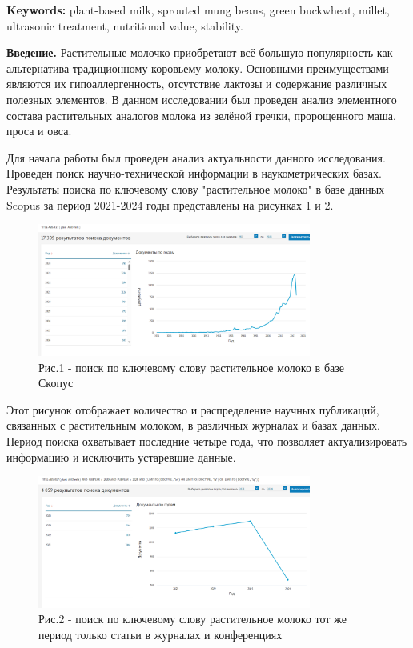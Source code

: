{\bfseries Keywords:} plant-based milk, sprouted mung beans, green
buckwheat, millet, ultrasonic treatment, nutritional value, stability.

\begin{multicols}{2}
{\bfseries Введение.} Растительные молочко приобретают всё большую
популярность как альтернатива традиционному коровьему молоку. Основными
преимуществами являются их гипоаллергенность, отсутствие лактозы и
содержание различных полезных элементов. В данном исследовании был
проведен анализ элементного состава растительных аналогов молока из
зелёной гречки, пророщенного маша, проса и овса.

Для начала работы был проведен анализ актуальности данного исследования.
Проведен поиск научно-технической информации в наукометрических базах.
Результаты поиска по ключевому слову "растительное молоко" в базе данных
Scopus за период 2021-2024 годы представлены на рисунках 1 и 2.
\end{multicols}

\begin{figure}[H]
	\centering
	\includegraphics[width=0.8\textwidth]{media/pish/image47}
	\caption*{Рис.1 - поиск по ключевому слову растительное молоко в базе Скопус}
\end{figure}

\begin{multicols}{2}
Этот рисунок отображает количество и распределение научных публикаций,
связанных с растительным молоком, в различных журналах и базах данных.
Период поиска охватывает последние четыре года, что позволяет
актуализировать информацию и исключить устаревшие данные.
\end{multicols}

\begin{figure}[H]
	\centering
	\includegraphics[width=0.8\textwidth]{media/pish/image48}
	\caption*{Рис.2 - поиск по ключевому слову растительное молоко тот же период только статьи в журналах и конференциях}
\end{figure}


